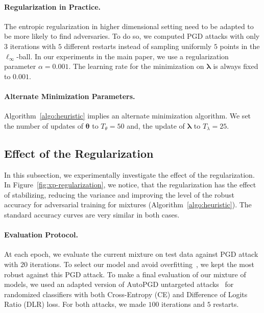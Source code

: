 \paragraph{Regularization in Practice.} The entropic regularization in higher dimensional setting need to be adapted to be more likely to find adversaries. To do so, we computed PGD attacks with only $3$ iterations with $5$ different restarts instead of sampling uniformly $5$ points  in the $\ell_\infty$-ball. In our experiments in the main paper, we use a regularization parameter $\alpha=0.001$. The learning rate for the minimization on $\bm{\lambda}$ is always fixed to $0.001$. 
\paragraph{Alternate Minimization Parameters.} Algorithm~\ref{algo:heuristic} implies an alternate minimization algorithm. We set the number of updates of $\bm{\theta}$ to $T_\theta = 50$ and, the update of $\bm{\lambda}$ to $T_\lambda = 25$. 

\subsection{Effect of the Regularization}
In this subsection, we experimentally investigate the effect of the regularization. In Figure~\ref{fig:xp-regularization}, we notice, that the regularization has the effect of stabilizing, reducing the variance and improving the level of the robust accuracy for adversarial training for mixtures (Algorithm~\ref{algo:heuristic}). The standard accuracy curves are very similar in both cases.



\paragraph{Evaluation Protocol.} At each epoch, we evaluate the current mixture on test data against PGD attack  with $20$ iterations. To select our model and avoid overfitting~\citep{rice2020overfitting}, we kept the most robust against this PGD attack.
To make a final evaluation of our mixture of models, we used an adapted version of $\textrm{AutoPGD}$ untargeted attacks~\citep{croce2020reliable} for randomized classifiers with both Cross-Entropy (CE) and Difference of Logits Ratio (DLR) loss. For both attacks, we made $100$ iterations and $5$ restarts.

